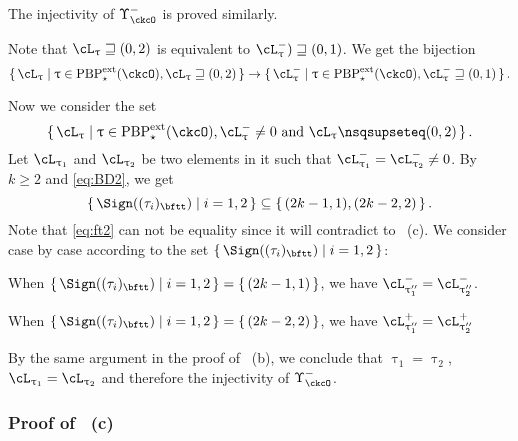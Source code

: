 \documentclass[12pt,a4paper]{amsart}
\numberwithin{equation}{section}
\theoremstyle{remark}
\def\PBPes{\mathrm{PBP}^{\mathrm{ext}}_{\star}}
\def\uptaupp{\uptau^{\prime\prime}}
\begin{document}
    \medskip

    The injectivity of $\Upsilon_{\ckcO}^{-}$ is proved similarly.

  Note that $\ac_{\uptau}\sqsupseteq (0,2)$ is equivalent to
  $\nac{\uptau})\sqsupseteq (0,1)$.
  We get the bijection
  \[
    \set{\ac_{\uptau}|\uptau\in \PBPes(\ckcO),\ac_{\uptau}\sqsupseteq (0,2)} \rightarrow
    \set{\nac{\uptau}|\uptau\in \PBPes(\ckcO),\nac{\uptau}\sqsupseteq (0,1)}.
  \]

  Now we consider the set
 \[
  \set{\ac_{\uptau}|\uptau\in \PBPes(\ckcO),\nac{\uptau}\neq 0 \text{ and } \ac_{\uptau}\nsqsupseteq (0,2)}.
 \] 
  Let $\ac_{\uptau_{1}}$ and $\ac_{\uptau_{2}}$ be two elements in it such that
  $\nac{\uptau_{1}}=\nac{\uptau_{2}}\neq 0$.
  By $k\geq 2$ and \eqref{eq:BD2}, we get 
  \begin{equation}\label{eq:ft2}
  \set{\Sign((\tau_{i})_{\bftt})| i = 1,2} \subseteq \set{ (2k-1,1),(2k-2,2)}.
  \end{equation}
  Note that \eqref{eq:ft2} can not be equality since it will contradict to
   ~(c).
  We consider case by case according to the set $\set{\Sign((\tau_{i})_{\bftt})|i=1,2}$:
  \begin{enumPF}
    \item When  
    $\set{\Sign((\tau_{i})_{\bftt})|i=1,2} = \set{(2k-1,1)}$,
    we have $\nac{\uptau''_{1}} = \nac{\uptau''_{2}}$.
    \item When  
    $\set{\Sign((\tau_{i})_{\bftt})|i=1,2} = \set{(2k-2,2)}$,
     we have  
    $\pac{\uptau''_{1}} = \pac{\uptau''_{2}}$
  \end{enumPF}
  By the same argument in the proof of ~(b), 
  we conclude that $\uptau_1 = \uptau_2$, $\ac_{ \uptau_{1} }=\ac_{ \uptau_{2} }$ and
  therefore the injectivity of $\Upsilon_{\ckcO}^{-}$.

  \subsubsection*{Proof of ~(c)}
\end{document}
